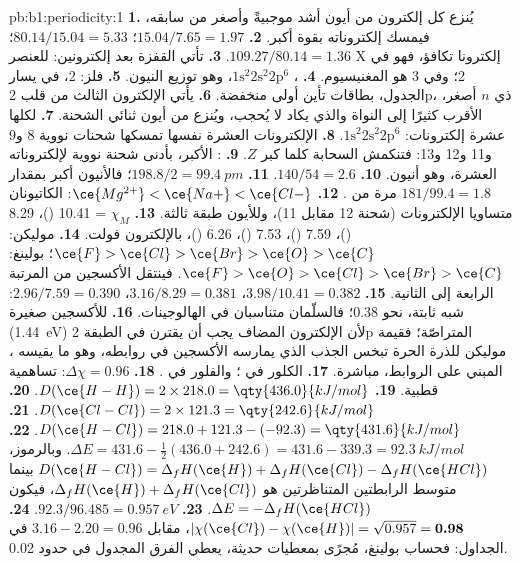 \begin{solution}{pb:b1:periodicity:1}
\textbf{1.} يُنزع كل إلكترون من أيون أشد موجبيةً وأصغر
من سابقه، فيمسك إلكتروناته بقوة أكبر.
\textbf{2.} $15.04/7.65 = 1.97$؛ $80.14/15.04 = 5.33$؛ $109.27/80.14 = 1.36$.
\textbf{3.} تأتي القفزة بعد إلكترونين: للعنصر X إلكترونا تكافؤ،
فهو في  2؛ وفي  3 هو المغنيسيوم.
\textbf{4.} ، $1\text{s}^2 2\text{s}^2 2\text{p}^6$، وهو
توزيع النيون.
\textbf{5.} فلز:  2، في يسار الجدول، بطاقات تأين
أولى منخفضة.
\textbf{6.} يأتي الإلكترون الثالث من قلب 2p، ذي $n$ أصغر،
الأقرب كثيرًا إلى النواة والذي يكاد لا يُحجب، ويُنزع من أيون
ثنائي الشحنة.
\textbf{7.} لكلها عشرة إلكترونات: $1\text{s}^2 2\text{s}^2 2\text{p}^6$.
\textbf{8.} الإلكترونات العشرة نفسها تمسكها شحنات نووية 8 و9 و11
و12 و13: فتنكمش السحابة كلما كبر $Z$.
\textbf{9.} : الأكبر، بأدنى شحنة نووية
لإلكتروناته العشرة، وهو أنيون.
\textbf{10.} $140/54 = 2.6$.
\textbf{11.} $198.8/2 = \qty{99.4}{pm}$؛ فالأنيون أكبر بمقدار $181/99.4 = 1.8$
مرة من .
\textbf{12.} $\ce{Mg^{2+}} < \ce{Na+} < \ce{Cl-}$: الكاتيونان
متساويا الإلكترونات (شحنة 12 مقابل 11)، وللأيون  طبقة ثالثة.
\textbf{13.} $\chi_M$ = 10.41 ()، 8.29 ()، 7.59 ()،
7.53 ()، 6.26 ()، بالإلكترون فولت.
\textbf{14.} موليكن: $\ce{F} > \ce{Cl} > \ce{Br} > \ce{O} > \ce{C}$؛
بولينغ: $\ce{F} > \ce{O} > \ce{Cl} > \ce{Br} > \ce{C}$. فينتقل الأكسجين
من المرتبة الرابعة إلى الثانية.
\textbf{15.} $3.98/10.41 = 0.382$، $3.16/8.29 = 0.381$، $2.96/7.59 =
0.390$: شبه ثابتة، نحو 0.38؛ فالسلّمان متناسبان في
الهالوجينات.
\textbf{16.}  للأكسجين صغيرة (\qty{1.44}{eV})
لأن الإلكترون المضاف يجب أن يقترن في الطبقة 2p المتراصّة؛ فقيمة
موليكن للذرة الحرة تبخس الجذب الذي يمارسه الأكسجين في
روابطه، وهو ما يقيسه ، المبني على الروابط، مباشرة.
\textbf{17.} الكلور في ؛ والفلور في .
\textbf{18.} $\Delta\chi = 0.96$: تساهمية قطبية.
\textbf{19.} $D(\ce{H-H}) = 2 \times 218.0 = \qty{436.0}{kJ/mol}$.
\textbf{20.} $D(\ce{Cl-Cl}) = 2 \times 121.3 = \qty{242.6}{kJ/mol}$.
\textbf{21.} $D(\ce{H-Cl}) = 218.0 + 121.3 - (-92.3) = \qty{431.6}{kJ/mol}$.
\textbf{22.} $\Delta E = 431.6 - \tfrac12(436.0 + 242.6) = 431.6 - 339.3 =
\qty{92.3}{kJ/mol}$. وبالرموز، $D(\ce{H-Cl}) = \Delta_fH(\ce{H}) +
\Delta_fH(\ce{Cl}) - \Delta_fH(\ce{HCl})$ بينما متوسط الرابطتين
المتناظرتين هو $\Delta_fH(\ce{H}) + \Delta_fH(\ce{Cl})$، فيكون $\Delta E =
-\Delta_fH(\ce{HCl})$.
\textbf{23.} $92.3/96.485 = \qty{0.957}{eV}$.
\textbf{24.} $|\chi(\ce{Cl}) - \chi(\ce{H})| = \sqrt{0.957} =
\textbf{0.98}$، مقابل $3.16 - 2.20 = 0.96$ في الجداول: فحساب بولينغ،
مُجرًى بمعطيات حديثة، يعطي الفرق المجدول في حدود
0.02.
\end{solution}
